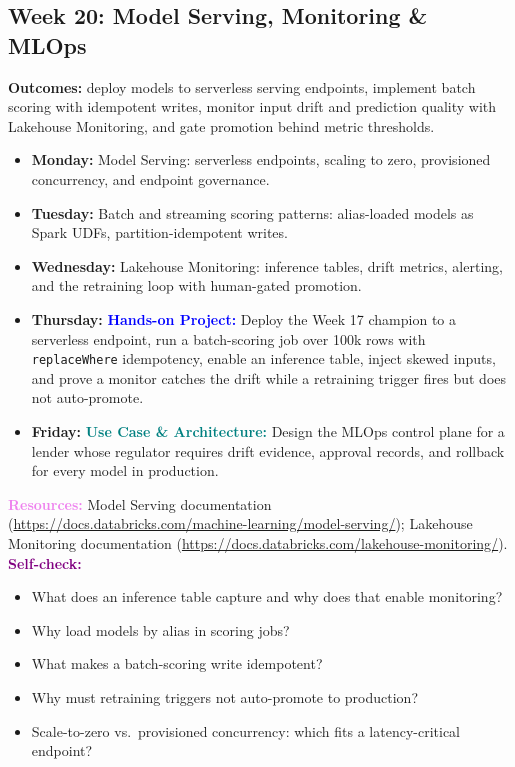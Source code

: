 \documentclass[11pt, a4paper]{article}
\newcommand{\project}[1]{\vspace{1mm}\noindent\textbf{\textcolor{blue}{Hands-on Project:}} #1}
\newcommand{\usecase}[1]{\vspace{1mm}\noindent\textbf{\textcolor{teal}{Use Case \& Architecture:}} #1}
\newcommand{\dayitem}[2]{\item \textbf{#1:} #2}
\newcommand{\resources}[1]{\vspace{1mm}\noindent\textbf{\textcolor{violet}{Resources:}} #1}
\newcommand{\selfcheck}[1]{\vspace{1mm}\noindent\textbf{\textcolor{purple}{Self-check:}} #1}
\begin{document}
\subsection*{Week 20: Model Serving, Monitoring \& MLOps}
\par\noindent\textbf{Outcomes:} deploy models to serverless serving endpoints, implement batch scoring with idempotent writes, monitor input drift and prediction quality with Lakehouse Monitoring, and gate promotion behind metric thresholds.
\begin{itemize}[label=-]
    \dayitem{Monday}{Model Serving: serverless endpoints, scaling to zero, provisioned concurrency, and endpoint governance.}
    \dayitem{Tuesday}{Batch and streaming scoring patterns: alias-loaded models as Spark UDFs, partition-idempotent writes.}
    \dayitem{Wednesday}{Lakehouse Monitoring: inference tables, drift metrics, alerting, and the retraining loop with human-gated promotion.}
    \dayitem{Thursday}{\project{Deploy the Week 17 champion to a serverless endpoint, run a batch-scoring job over 100k rows with \texttt{replaceWhere} idempotency, enable an inference table, inject skewed inputs, and prove a monitor catches the drift while a retraining trigger fires but does not auto-promote.}}
    \dayitem{Friday}{\usecase{Design the MLOps control plane for a lender whose regulator requires drift evidence, approval records, and rollback for every model in production.}}
\end{itemize}
\resources{Model Serving documentation (\url{https://docs.databricks.com/machine-learning/model-serving/}); Lakehouse Monitoring documentation (\url{https://docs.databricks.com/lakehouse-monitoring/}).}
\selfcheck{\begin{itemize}[label=-, leftmargin=1.5em, itemsep=0pt]
    \item What does an inference table capture and why does that enable monitoring?
    \item Why load models by alias in scoring jobs?
    \item What makes a batch-scoring write idempotent?
    \item Why must retraining triggers not auto-promote to production?
    \item Scale-to-zero vs.\ provisioned concurrency: which fits a latency-critical endpoint?
\end{itemize}}
\end{document}
